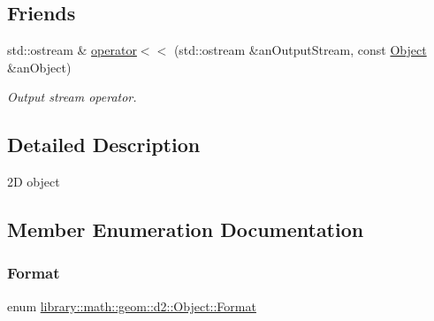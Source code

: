 \subsection*{Friends}
\begin{DoxyCompactItemize}
\item 
std\+::ostream \& \hyperlink{classlibrary_1_1math_1_1geom_1_1d2_1_1_object_a418df9bf4a73078f3d494edef1743f8d}{operator$<$$<$} (std\+::ostream \&an\+Output\+Stream, const \hyperlink{classlibrary_1_1math_1_1geom_1_1d2_1_1_object}{Object} \&an\+Object)
\begin{DoxyCompactList}\small\item\em Output stream operator. \end{DoxyCompactList}\end{DoxyCompactItemize}


\subsection{Detailed Description}
2D object 

\subsection{Member Enumeration Documentation}
\mbox{\label{classlibrary_1_1math_1_1geom_1_1d2_1_1_object_ac8cd61dada4960cfee9a469231621b17}} 
\subsubsection{\texorpdfstring{Format}{Format}}
{\footnotesize\ttfamily enum \hyperlink{classlibrary_1_1math_1_1geom_1_1d2_1_1_object_ac8cd61dada4960cfee9a469231621b17}{library\+::math\+::geom\+::d2\+::\+Object\+::\+Format}\hspace{0.3cm}{\ttfamily [strong]}}

